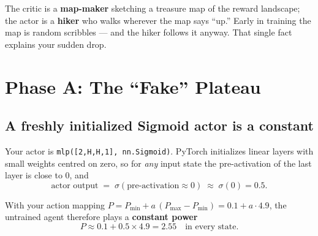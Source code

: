 \documentclass[11pt]{article}
\begin{document}
\begin{analogybox}
The critic is a \textbf{map-maker} sketching a treasure map of the reward landscape;
the actor is a \textbf{hiker} who walks wherever the map says ``up.'' Early in
training the map is random scribbles --- and the hiker follows it anyway. That single
fact explains your sudden drop.
\end{analogybox}

\section{Phase A: The ``Fake'' Plateau}

\subsection{A freshly initialized Sigmoid actor is a constant}

Your actor is \texttt{mlp([2,H,H,1], nn.Sigmoid)}. PyTorch initializes linear layers
with small weights centred on zero, so for \emph{any} input state the pre-activation
of the last layer is close to $0$, and
\[
\text{actor output} \;=\; \sigma(\text{pre-activation} \approx 0) \;\approx\; \sigma(0) = 0.5 .
\]

\begin{center}
\end{center}

With your action mapping $P = P_{\min} + a\,(P_{\max}-P_{\min}) = 0.1 + a\cdot4.9$,
the untrained agent therefore plays a \textbf{constant power}
\[
P \approx 0.1 + 0.5 \times 4.9 = 2.55 \quad \text{in every state.}
\]
\end{document}
